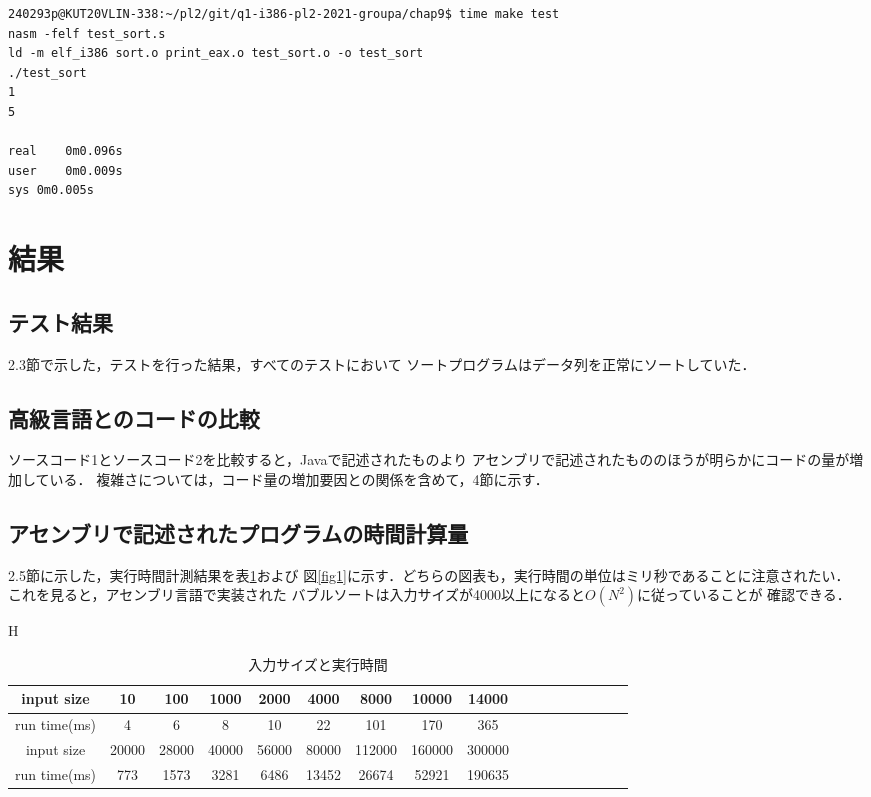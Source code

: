 \documentclass[a4j]{jarticle}
\begin{document}
\begin{lstlisting}[caption=timeコマンド実行例]
  240293p@KUT20VLIN-338:~/pl2/git/q1-i386-pl2-2021-groupa/chap9$ time make test
nasm -felf test_sort.s
ld -m elf_i386 sort.o print_eax.o test_sort.o -o test_sort
./test_sort
1
5

real	0m0.096s
user	0m0.009s
sys	0m0.005s

\end{lstlisting}

\section{結果}
\subsection{テスト結果}
2.3節で示した，テストを行った結果，すべてのテストにおいて
ソートプログラムはデータ列を正常にソートしていた．

\subsection{高級言語とのコードの比較}
ソースコード1とソースコード2を比較すると，Javaで記述されたものより
アセンブリで記述されたもののほうが明らかにコードの量が増加している．
複雑さについては，コード量の増加要因との関係を含めて，4節に示す．


\subsection{アセンブリで記述されたプログラムの時間計算量}
2.5節に示した，実行時間計測結果を表\ref{table2}および
図\ref{fig1}に示す．どちらの図表も，実行時間の単位はミリ秒であることに注意されたい．
これを見ると，アセンブリ言語で実装された
バブルソートは入力サイズが4000以上になると$O(N^{2})$に従っていることが
確認できる．

\begin{table}{H}
  \centering
  \caption{入力サイズと実行時間}
  \label{table2}
  \begin{tabular}{|c||c|c|c|c|c|c|c|c|c|c|c|c|c|c|c|c|}
    \hline
    input size & 10 & 100 & 1000 & 2000 & 4000 & 8000 & 10000& 14000 \\
    \hline
    run time(ms) & 4 & 6 & 8 & 10 & 22 & 101 & 170 & 365  \\
    \hline
    \hline
     input size & 20000 & 28000 & 40000 & 56000 & 80000 & 112000 & 160000& 300000\\
     \hline
     run time(ms) & 773 & 1573 & 3281 & 6486 & 13452 & 26674 & 52921 & 190635 \\
     \hline
  \end{tabular}
\end{table}
\end{document}
